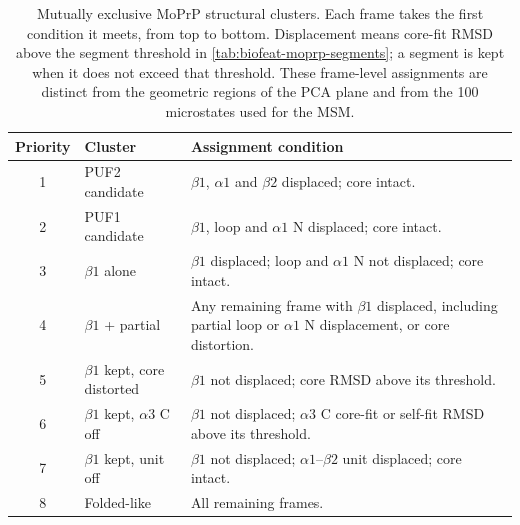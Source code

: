 \begin{table}[htbp]
    \centering
    \small
    \begin{tabularx}{\textwidth}{@{}c>{\raggedright\arraybackslash}p{}>{\raggedright\arraybackslash}X@{}}
    \toprule
        \textbf{Priority} & \textbf{Cluster} & \textbf{Assignment condition} \\
    \midrule
        1 & PUF2 candidate & $\beta1$, $\alpha1$ and $\beta2$ displaced; core intact. \\
        2 & PUF1 candidate & $\beta1$, loop and $\alpha1$ N displaced; core intact. \\
        3 & $\beta1$ alone & $\beta1$ displaced; loop and $\alpha1$ N not displaced; core intact. \\
        4 & $\beta1$ + partial & Any remaining frame with $\beta1$ displaced, including partial loop or $\alpha1$ N displacement, or core distortion. \\
        5 & $\beta1$ kept, core distorted & $\beta1$ not displaced; core RMSD above its threshold. \\
        6 & $\beta1$ kept, $\alpha3$ C off & $\beta1$ not displaced; $\alpha3$ C core-fit or self-fit RMSD above its threshold. \\
        7 & $\beta1$ kept, unit off & $\beta1$ not displaced; $\alpha1$--$\beta2$ unit displaced; core intact. \\
        8 & Folded-like & All remaining frames. \\
    \bottomrule
    \end{tabularx}
    \caption{Mutually exclusive MoPrP structural clusters. Each frame takes the first condition it meets, from top to bottom. Displacement means core-fit RMSD above the segment threshold in \cref{tab:biofeat-moprp-segments}; a segment is kept when it does not exceed that threshold. These frame-level assignments are distinct from the geometric regions of the PCA plane and from the 100 microstates used for the MSM.}
    \label{tab:biofeat-moprp-clusters}
\end{table}

